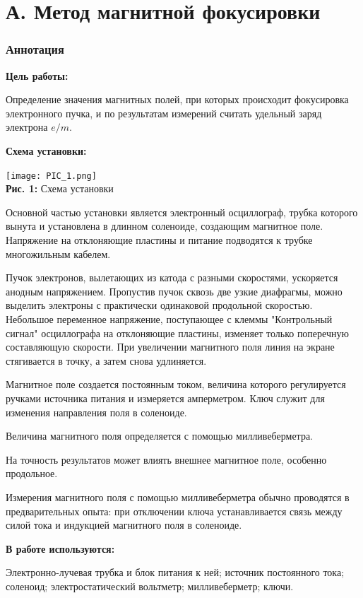 \documentclass[12pt,a4paper]{scrartcl}
\begin{document}
	\part*{А. Метод магнитной фокусировки}	
	
	\section{Аннотация}
	
	\textbf{Цель работы: }
	
	Определение значения магнитных полей, при которых происходит фокусировка электронного пучка, и по результатам измерений считать удельный заряд электрона $e/m$.	
	
	\textbf{Схема установки:}
	\begin{center}
		\texttt{[image: PIC\_1.png]}
		\\\textbf{Рис. 1:} Схема установки
	\end{center}
	
		Основной частью установки является электронный осциллограф, трубка которого вынута и установлена в длинном соленоиде, создающим магнитное поле. Напряжение на отклоняющие пластины и питание подводятся к трубке многожильным кабелем.

Пучок электронов, вылетающих из катода с разными скоростями, ускоряется анодным напряжением. Пропустив пучок сквозь две узкие диафрагмы, можно выделить электроны с практически одинаковой продольной скоростью. Небольшое переменное напряжение, поступающее с клеммы "Контрольный сигнал" осциллографа на отклоняющие пластины, изменяет только поперечную составляющую скорости. При увеличении магнитного поля линия на экране стягивается в точку, а затем снова удлиняется. 

Магнитное поле создается постоянным током, величина которого регулируется ручками источника питания и измеряется амперметром. Ключ служит для изменения направления поля в соленоиде.

Величина магнитного поля определяется с помощью милливеберметра.

На точность результатов может влиять внешнее магнитное поле, особенно продольное. 

Измерения магнитного поля с помощью милливеберметра обычно проводятся в предварительных опыта: при отключении ключа устанавливается связь между силой тока и индукцией магнитного поля в соленоиде.

	\textbf{В работе используются:}
	
	Электронно-лучевая трубка и блок питания к ней; источник постоянного тока; соленоид; электростатический вольтметр; милливеберметр; ключи.
\end{document}
